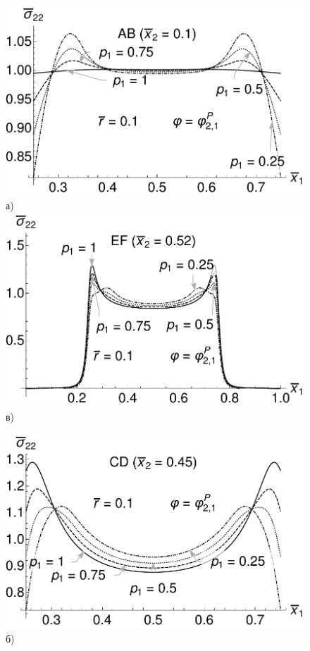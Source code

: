 \begin{figure}[ht]
    \begin{minipage}[b][][b]{0.49\linewidth}\centering
        \includegraphics[width=\linewidth]{pics/TStressAB.pdf} \\ а)
        \includegraphics[width=\linewidth]{pics/TStressEF.pdf} \\ в)
    \end{minipage}
    \hfill
    \begin{minipage}[b][][b]{0.49\linewidth}\centering
        \includegraphics[width=\linewidth]{pics/TStressCD.pdf} \\ б)

\end{minipage}
\end{figure}
